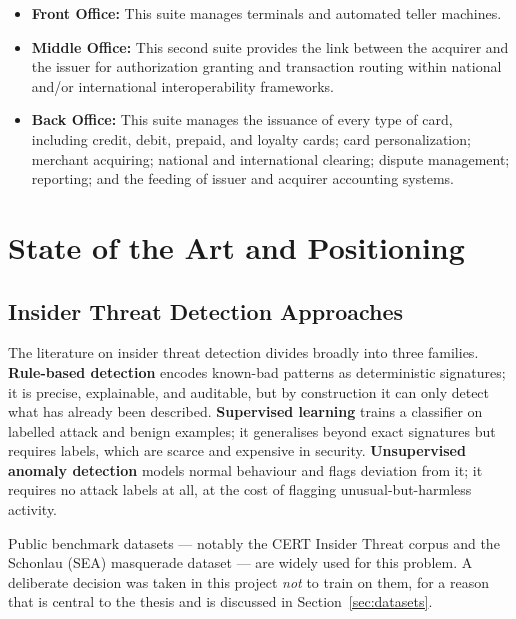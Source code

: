 \documentclass{classeENS}
\begin{document}
\begin{itemize}
    \item \textbf{Front Office:} This suite manages terminals and automated teller machines. %
    \item \textbf{Middle Office:} This second suite provides the link between the acquirer and the issuer for authorization granting and transaction routing within national and/or international interoperability frameworks. %
    \item \textbf{Back Office:} This suite manages the issuance of every type of card, including credit, debit, prepaid, and loyalty cards; card personalization; merchant acquiring; national and international clearing; dispute management; reporting; and the feeding of issuer and acquirer accounting systems. %
\end{itemize}

\section{State of the Art and Positioning}
\label{sec:sota}

\subsection{Insider Threat Detection Approaches}
The literature on insider threat detection divides broadly into three families. \textbf{Rule-based detection} encodes known-bad patterns as deterministic signatures; it is precise, explainable, and auditable, but by construction it can only detect what has already been described. \textbf{Supervised learning} trains a classifier on labelled attack and benign examples; it generalises beyond exact signatures but requires labels, which are scarce and expensive in security. \textbf{Unsupervised anomaly detection} models normal behaviour and flags deviation from it; it requires no attack labels at all, at the cost of flagging unusual-but-harmless activity.

Public benchmark datasets --- notably the CERT Insider Threat corpus and the Schonlau (SEA) masquerade dataset --- are widely used for this problem. A deliberate decision was taken in this project \emph{not} to train on them, for a reason that is central to the thesis and is discussed in Section~\ref{sec:datasets}.
\end{document}
